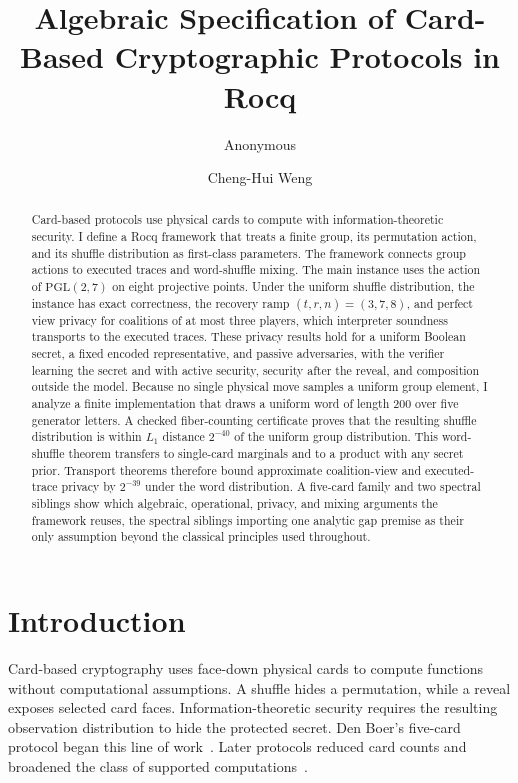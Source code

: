\documentclass[runningheads]{llncs}
\title{Algebraic Specification of Card-Based Cryptographic Protocols in Rocq}
\author{Anonymous}
\institute{Submission to WADT 2026}
\author{Cheng-Hui Weng}
\institute{Nagoya University}
\newcommand{\Rocq}{Rocq}
\newcommand{\PG}{\mathrm{PGL}(2,7)}
\begin{document}
\maketitle

\begin{abstract}
Card-based protocols use physical cards to compute with
information-theoretic security. I define a \Rocq{} framework that treats a
finite group, its permutation action, and its shuffle distribution as first-class
parameters. The framework connects group actions to executed traces and
word-shuffle mixing. The main instance uses the action of
$\PG$ on eight projective points.
Under the uniform shuffle distribution, the instance has exact correctness,
the recovery ramp $(t,r,n)=(3,7,8)$, and perfect view privacy for
coalitions of at most three players, which interpreter soundness transports
to the executed traces. These privacy results hold for a uniform Boolean
secret, a fixed encoded representative, and passive adversaries, with the
verifier learning the secret and with active security, security after the
reveal, and composition outside the model. Because no single physical move samples a uniform group element, I
analyze a finite implementation that draws a uniform word of length 200
over five generator letters. A checked fiber-counting certificate proves that
the resulting shuffle distribution is within $L_1$ distance $2^{-40}$ of the
uniform group distribution. This word-shuffle theorem transfers to single-card
marginals and to a product with any secret prior. Transport theorems therefore bound approximate coalition-view and
executed-trace privacy by $2^{-39}$ under the word distribution.
A five-card family and two spectral siblings show which algebraic,
operational, privacy, and mixing arguments the framework reuses, the
spectral siblings importing one analytic gap premise as their only
assumption beyond the classical principles used throughout.
\end{abstract}

\section{Introduction}\label{sec:introduction}

Card-based cryptography uses face-down physical cards to compute functions
without computational assumptions. A shuffle hides a permutation, while a
reveal exposes selected card faces. Information-theoretic security requires
the resulting observation distribution to hide the protected secret. Den Boer's
five-card protocol began this line of work~\cite{denBoer1989}. Later protocols
reduced card counts and broadened the class of supported
computations~\cite{MizukiSone2009,MizukiSone2012,KochWalzerHartel2015}.
\end{document}
